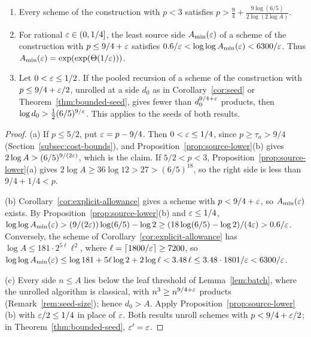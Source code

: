 \begin{corollary}\label{cor:source-tradeoff}
\leavevmode
\begin{enumerate}
\item[(a)] Every scheme of the construction with \(p<3\) satisfies
\(\displaystyle p>\frac94+\frac{9\log(6/5)}{2\log(2\log A)}\).
\item[(b)] For rational \(\varepsilon\in(0,1/4]\), the least source side
\(A_{\min}(\varepsilon)\) of a scheme of the construction with \(p\le9/4+\varepsilon\)
satisfies \(0.6/\varepsilon<\log\log A_{\min}(\varepsilon)<6300/\varepsilon\). Thus
\(A_{\min}(\varepsilon)=\exp(\exp(\Theta(1/\varepsilon)))\).
\item[(c)] Let \(0<\varepsilon\le1/2\). If the pooled recursion of a scheme of
the construction with \(p\le9/4+\varepsilon/2\), unrolled at a side \(d_0\) as
in Corollary~\ref{cor:seed} or Theorem~\ref{thm:bounded-seed}, gives
fewer than \(d_0^{9/4+\varepsilon}\) products, then
\(\log d_0>\frac12(6/5)^{9/\varepsilon}\). This applies to the seeds of both
results.
\end{enumerate}
\end{corollary}

\begin{proof}
(a) If \(p\le5/2\), put \(\varepsilon=p-9/4\). Then \(0<\varepsilon\le1/4\), since
\(p\ge\tau_a>9/4\) (Section~\ref{subsec:cost-bounds}), and
Proposition~\ref{prop:source-lower}(b) gives
\(2\log A>(6/5)^{9/(2\varepsilon)}\), which is the claim. If \(5/2<p<3\),
Proposition~\ref{prop:source-lower}(a) gives
\(2\log A\ge36\log12>27>(6/5)^{18}\), so the right side is less than
\(9/4+1/4<p\).

(b) Corollary~\ref{cor:explicit-allowance} gives a scheme with
\(p<9/4+\varepsilon\), so \(A_{\min}(\varepsilon)\) exists. By
Proposition~\ref{prop:source-lower}(b) and \(\varepsilon\le1/4\),
\(\log\log A_{\min}(\varepsilon)>(9/(2\varepsilon))\log(6/5)-\log2
\ge(18\log(6/5)-\log2)/(4\varepsilon)>0.6/\varepsilon\). Conversely, the
scheme of Corollary~\ref{cor:explicit-allowance} has
\(\log A\le181\cdot2^{5\ell}\ell^2\), where
\(\ell=\lceil1800/\varepsilon\rceil\ge7200\), so
\(\log\log A_{\min}(\varepsilon)\le\log181+5\ell\log2+2\log\ell<3.48\,\ell
\le3.48\cdot1801/\varepsilon<6300/\varepsilon\).

(c) Every side \(n\le A\) lies below the leaf threshold of
Lemma~\ref{lem:batch}, where the unrolled algorithm is classical, with
\(n^3\ge n^{9/4+\varepsilon}\) products (Remark~\ref{rem:seed-size}); hence
\(d_0>A\). Apply Proposition~\ref{prop:source-lower}(b) with
\(\varepsilon/2\le1/4\) in place of \(\varepsilon\). Both results unroll schemes with
\(p<9/4+\varepsilon/2\); in Theorem~\ref{thm:bounded-seed}, \(\varepsilon'=\varepsilon\).
\end{proof}

